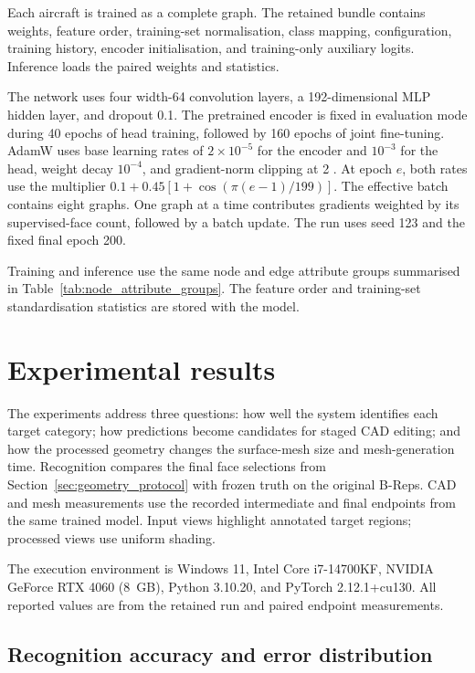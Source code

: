 \documentclass[12pt,a4paper]{article}
\begin{document}
Each aircraft is trained as a complete graph. The retained bundle contains weights, feature order, training-set normalisation, class mapping, configuration, training history, encoder initialisation, and training-only auxiliary logits. Inference loads the paired weights and statistics.

The network uses four width-64 convolution layers, a 192-dimensional MLP hidden layer, and dropout 0.1. The pretrained encoder is fixed in evaluation mode during 40 epochs of head training, followed by 160 epochs of joint fine-tuning. AdamW uses base learning rates of $2\times10^{-5}$ for the encoder and $10^{-3}$ for the head, weight decay $10^{-4}$, and gradient-norm clipping at 2 \parencite{loshchilov2019adamw}. At epoch $e$, both rates use the multiplier $0.1+0.45[1+\cos(\pi(e-1)/199)]$. The effective batch contains eight graphs. One graph at a time contributes gradients weighted by its supervised-face count, followed by a batch update. The run uses seed 123 and the fixed final epoch 200.

Training and inference use the same node and edge attribute groups summarised in Table~\ref{tab:node_attribute_groups}. The feature order and training-set standardisation statistics are stored with the model.



\section{Experimental results}\label{sec:results}

The experiments address three questions: how well the system identifies each target category; how predictions become candidates for staged CAD editing; and how the processed geometry changes the surface-mesh size and mesh-generation time. Recognition compares the final face selections from Section~\ref{sec:geometry_protocol} with frozen truth on the original B-Reps. CAD and mesh measurements use the recorded intermediate and final endpoints from the same trained model. Input views highlight annotated target regions; processed views use uniform shading.

The execution environment is Windows 11, Intel Core i7-14700KF, NVIDIA GeForce RTX 4060 (8~GB), Python 3.10.20, and PyTorch 2.12.1+cu130. All reported values are from the retained run and paired endpoint measurements.

\subsection{Recognition accuracy and error distribution}\label{sec:e1_results}
\end{document}
